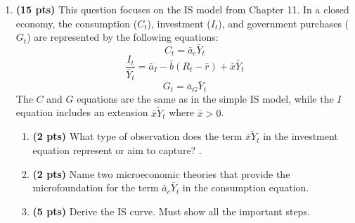 \documentclass[14pt, oneside]{memoir}
\begin{document}
\begin{enumerate}[label=\textbf{\arabic*.}, itemsep=15pt]
\begin{enumerate}[label=(\alph*)]
	\item The central would want to set $\pi = 0$, which implies $g_m = g_Y$
	
	\item The growth rate of the output is hard to predict. Therefore, the central bank may risk creating a negative inflation rate (i.e., deflation) in the short-run. 
	
	\vspace{1cm}
	
	
\end{enumerate}

\clearpage



\item  \textbf{(15 pts)}\label{P2} This question focuses on the IS model from Chapter 11. In a closed economy, the consumption ($C_t$), investment ($I_t$), and government purchases ($G_t$) are represented by the following equations:
\[C_t = \bar{a}_c \bar{Y}_t\]
\[\frac{I_t}{\bar{Y}_t} = \bar{a}_I  - \bar{b} \left(R_t - \bar{r}\right) + \bar{x} \widetilde{Y_t}\]
\[G_t = \bar{a}_G \bar{Y}_t \]
The $C$ and $G$ equations are the same as in the simple IS model, while the $I$ equation includes an extension $\bar{x}\widetilde{Y}_t$ where $\bar{x} >0$.

\begin{enumerate}[label=(\alph*)]
	\item \textbf{(2 pts)} What type of observation does the term \( \bar{x} \tilde{Y}_t \) in the investment equation represent or aim to capture?
.
	
	\vspace{7cm}
	\item \textbf{(2 pts)} Name two microeconomic theories that provide the microfoundation for the term \( \bar{a}_c \bar{Y}_t \) in the consumption equation.
	
	
	\newpage
	
	\item \textbf{(5 pts)} Derive the IS curve. Must show all the important steps.
	

\end{enumerate}
\end{enumerate}
\end{document}
